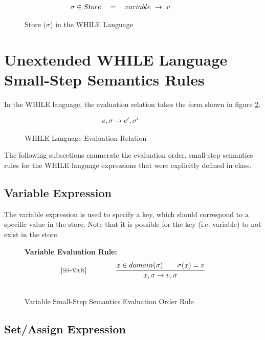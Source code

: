 \documentclass{article}
\begin{document}
\begin{figure}[H]
\caption{Store ($\sigma$) in the WHILE Language}
\label{fig:sigma}
\[
\\
\begin{array}{r@{\qquad\qquad}l}
  \sigma \in {Store} \quad  = \quad {variable} ~\rightarrow ~v
\end{array}
\]
\end{figure}

\section{Unextended WHILE Language Small-Step Semantics Rules}

In the WHILE language, the evaluation relation takes the form shown in figure \ref{fig:whileRelation}.

\begin{figure}[H]
\caption{WHILE Language Evaluation Relation}
\label{fig:whileRelation}
\[
\\
\begin{array}{r@{\qquad\qquad}l}
  \sstep{e}{\sigma}{e'}{\sigma'} \\
\end{array}
\]
\end{figure}

The following subsections enumerate the evaluation order, small-step semantics rules for the WHILE language expressions that were explicitly defined in class.  

\subsection{Variable Expression}

The variable expression is used to specify a key, which should correspond to a specific value in the store.  Note that it is possible for the key (i.e. variable) to not exist in the store.

\begin{figure}[H]
\caption{Variable Small-Step Semantics Evaluation Order Rule}
\label{fig:varRules}
{\bf Variable Evaluation Rule:}
\[
\\
\begin{array}{r@{\qquad\qquad}l}
\ssrule{ss-var}{
  x \in domain(\sigma) \qquad \sigma(x)=v
}{
  \sstep{x}{\sigma}{v}{\sigma}
}
\end{array}
\]
\end{figure}

\subsection{Set/Assign Expression}
\end{document}
